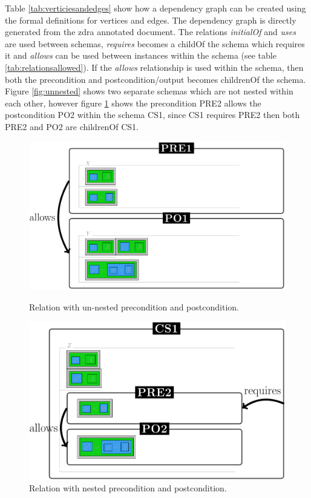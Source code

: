 Table \ref{tab:verticiesandedges} show how a dependency graph can be created
using the formal definitions for vertices and edges. The dependency graph is
directly generated from the \gls{zdra} annotated document. The relations
\emph{initialOf} and \emph{uses} are used between schemas, \emph{requires}
becomes a childOf the schema which requires it and \emph{allows} can be used
between instances within the schema (see table \ref{tab:relationsallowed}). If
the \emph{allows} relationship is used within the schema, then both the
precondition and postcondition/output becomes childrenOf the schema. Figure
\ref{fig:unnested} shows two separate schemas which are not nested within
each other, however figure \ref{fig:nested} shows the precondition PRE2 allows
the postcondition PO2 within the schema CS1, since CS1 requires PRE2 then both
PRE2 and PO2 are childrenOf CS1.

\begin{figure}[H]
\centering
\begin{minipage}{0.45\textwidth}
\centering
\includegraphics[scale=0.18]{Figures/Formalising/unnested.png}
\caption{Relation with un-nested precondition and postcondition.  \label{fig:unnested}}
\end{minipage}\hfill
\begin{minipage}{0.45\textwidth}
\centering
\includegraphics[scale=0.18]{Figures/Formalising/nested.png}
\caption{Relation with nested precondition and postcondition.  \label{fig:nested}}
\end{minipage}
\end{figure}

